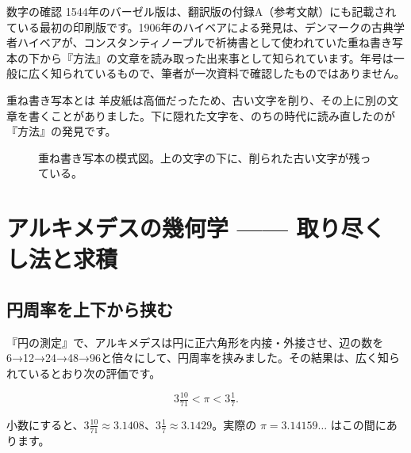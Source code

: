 \documentclass[a4paper,11pt,openany]{ltjsbook}
\begin{document}
\begin{notebox}{数字の確認}
1544年のバーゼル版は、翻訳版の付録A（参考文献）にも記載されている最初の印刷版です。1906年のハイベアによる発見は、デンマークの古典学者ハイベアが、コンスタンティノープルで祈祷書として使われていた重ね書き写本の下から『方法』の文章を読み取った出来事として知られています。年号は一般に広く知られているもので、筆者が一次資料で確認したものではありません。
\end{notebox}

\begin{pointbox}{重ね書き写本とは}
羊皮紙は高価だったため、古い文字を削り、その上に別の文章を書くことがありました。下に隠れた文字を、のちの時代に読み直したのが『方法』の発見です。
\end{pointbox}

\begin{figure}[htbp]
\centering
{}
\caption{重ね書き写本の模式図。上の文字の下に、削られた古い文字が残っている。}
\end{figure}

\chapter{アルキメデスの幾何学 —— 取り尽くし法と求積}

\section{円周率を上下から挟む}

『円の測定』で、アルキメデスは円に正六角形を内接・外接させ、辺の数を6→12→24→48→96と倍々にして、円周率を挟みました。その結果は、広く知られているとおり次の評価です。

\[
3\tfrac{10}{71} < \pi < 3\tfrac{1}{7}.
\]

小数にすると、$3\frac{10}{71}\approx3.1408$、$3\frac17\approx3.1429$。実際の $\pi=3.14159\ldots$ はこの間にあります。
\end{document}
